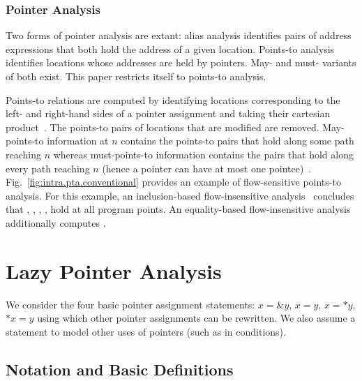 \documentclass{llncs}
\newcommand{\pt}[2]{\text{$(#1,#2)$}}
\begin{document}
\subsubsection{Pointer Analysis}

Two forms of pointer analysis are extant: alias analysis identifies
pairs of address expressions that both hold the address of a given
location. Points-to analysis identifies locations whose addresses are
held by pointers. May- and must- variants of both exist. This paper
restricts itself to points-to analysis.



Points-to relations are computed by identifying locations corresponding
to the left- and right-hand sides of a pointer assignment and taking
their cartesian product~\cite{Emami.M.Ghiya.R.Hendren.LJ:1994:Context-sensitive-interprocedural-points-to,Kanade.A.Khedker.UP.Sanyal.A:2005:Heterogeneous-Fixed-Points}. 
The points-to pairs of locations that are modified are removed.
May-points-to information at $n$ contains the points-to pairs that hold
along some path reaching $n$ whereas must-points-to information 
contains the pairs that hold along every path reaching $n$
(hence a pointer can have at most one pointee)~\cite{Kanade.A.Khedker.UP.Sanyal.A:2005:Heterogeneous-Fixed-Points}. 
Fig.~\ref{fig:intra.pta.conventional} provides an example of flow-sensitive
points-to analysis.  For this example, an inclusion-based flow-insensitive 
analysis~\cite{Andersen.LO:1994:Program-Analysis-and}
concludes that \pt{p}{r}, \pt{p}{s}, \pt{q}{r}, \pt{r}{s}, \pt{s}{r}
hold at all program points.
An equality-based flow-insensitive analysis~\cite{Steensgaard.B:1996:Points-to-Analysis-in}
additionally computes \pt{q}{s}.




\section{Lazy Pointer Analysis}
\label{sec:lazy.pta}

We consider the four basic pointer assignment statements: $x = \&y$,
$x = y$, $x = *y$, $*x = y$ using which other pointer assignments can
be rewritten. We also assume a  statement to model
other uses of pointers (such as in conditions).

\subsection{Notation and Basic Definitions}
\end{document}

